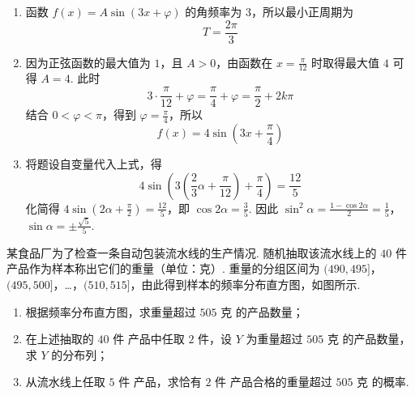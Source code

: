 \begin{solution}
\begin{enumerate}
\item 函数 \(f(x)=A\sin(3x+\varphi)\) 的角频率为 \(3\)，所以最小正周期为
\[
T=\frac{2\pi}{3}
\]
\item 因为正弦函数的最大值为 \(1\)，且 \(A>0\)，由函数在 \(x=\frac{\pi}{12}\) 时取得最大值 \(4\) 可得 \(A=4\). 此时
\[
3\cdot\frac{\pi}{12}+\varphi=\frac\pi4+\varphi=\frac\pi2+2k\pi
\]
结合 \(0<\varphi<\pi\)，得到 \(\varphi=\frac\pi4\)，所以
\[
f(x)=4\sin\left(3x+\frac\pi4\right)
\]
\item 将题设自变量代入上式，得
\[
4\sin\left(3\left(\frac23\alpha+\frac\pi{12}\right)+\frac\pi4\right)=\frac{12}{5}
\]
化简得 \(4\sin\left(2\alpha+\frac\pi2\right)=\frac{12}{5}\)，即 \(\cos2\alpha=\frac35\). 因此
\(\sin^2\alpha=\frac{1-\cos2\alpha}{2}=\frac15\)，\(\sin\alpha=\pm\frac{\sqrt5}{5}\).
\end{enumerate}
\end{solution}

\begin{problem}
某食品厂为了检查一条自动包装流水线的生产情况. 随机抽取该流水线上的 \(40\text{ 件}\) 产品作为样本称出它们的重量（单位：\(\text{克}\)）. 重量的分组区间为 \((490, 495]\)，\((495, 500]\)，…，\((510, 515]\)，由此得到样本的频率分布直方图，如图所示.

\begin{enumerate}
\item 根据频率分布直方图，求重量超过 \(505\text{ 克}\) 的产品数量；
\item 在上述抽取的 \(40\text{ 件}\) 产品中任取 \(2\text{ 件}\)，设 \(Y\) 为重量超过 \(505\text{ 克}\) 的产品数量，求 \(Y\) 的分布列；
\item 从流水线上任取 \(5\text{ 件}\) 产品，求恰有 \(2\text{ 件}\) 产品合格的重量超过 \(505\text{ 克}\) 的概率.
\end{enumerate}

\end{problem}

